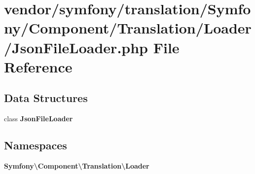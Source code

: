 \section{vendor/symfony/translation/\+Symfony/\+Component/\+Translation/\+Loader/\+Json\+File\+Loader.php File Reference}
\label{_json_file_loader_8php}
\subsection*{Data Structures}
\begin{DoxyCompactItemize}
\item 
class {\bf Json\+File\+Loader}
\end{DoxyCompactItemize}
\subsection*{Namespaces}
\begin{DoxyCompactItemize}
\item 
 {\bf Symfony\textbackslash{}\+Component\textbackslash{}\+Translation\textbackslash{}\+Loader}
\end{DoxyCompactItemize}
